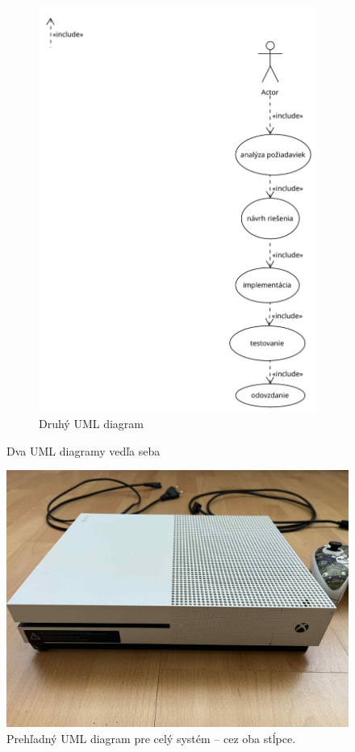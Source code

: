 \documentclass[10pt,twocolumn,twoside,slovak,a4paper]{article}
\begin{document}
\begin{figure}[h!]
\begin{subfigure}[t]{0.48\columnwidth}
        \includegraphics[width=\linewidth]{diagram2.pdf}
        \caption{Druhý UML diagram}
        \label{fig:diagram2}
    \end{subfigure}
    \caption{Dva UML diagramy vedľa seba}
    \label{fig:uml-diagrams}
\end{figure}
\begin{figure}[t!]
    \centering
    \includegraphics[width=\textwidth]{obrazokcez2.jpg}
    \caption{Prehľadný UML diagram pre celý systém – cez oba stĺpce.}
    \label{fig:uml-wide}
\end{figure}
\end{document}
